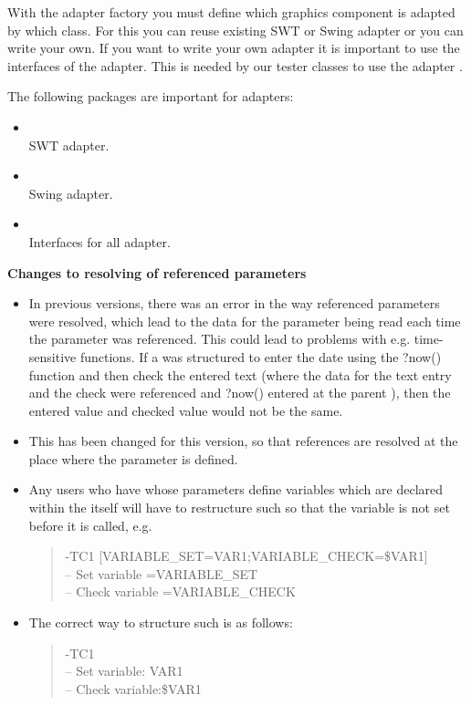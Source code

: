 With the adapter factory you must define which graphics component is adapted by which class. For this you can reuse existing SWT or Swing adapter or you can write your own.
If you want to write your own adapter it is important to use the interfaces of the adapter. This is needed by our tester classes to use the adapter .

The following packages are important for adapters:
\begin{itemize}
\item {}\\ SWT adapter.
\item {}\\ Swing adapter.
\item {}\\Interfaces for all adapter.
\end{itemize}

\textbf{Changes to resolving of referenced parameters}\\
\begin{itemize}
\item In previous versions, there was an error in the way referenced parameters were resolved, which lead to the data for the parameter being read each time the parameter was referenced. This could lead to problems with e.g. time-sensitive functions. If a \gdcase{} was structured to enter the date using the ?now() function and then check the entered text (where the data for the text entry and the check were referenced and ?now() entered at the parent \gdcase{}), then the entered value and checked value would not be the same.
\item This has been changed for this version, so that references are resolved at the place where the parameter is defined. 
\item Any users who have \gdcases{} whose parameters define variables which are declared within the \gdcase{} itself will have to restructure such \gdcases{} so that the variable is not set before it is called, e.g.
\begin{quote}
-TC1 [VARIABLE\_SET=VAR1;VARIABLE\_CHECK=\$VAR1]\\
-- Set variable =VARIABLE\_SET\\
-- Check variable =VARIABLE\_CHECK
\end{quote}
\item The correct way to structure such \gdcases{} is as follows:
\begin{quote}
-TC1\\
-- Set variable: VAR1\\
-- Check variable:\$VAR1
\end{quote}
\end{itemize}


